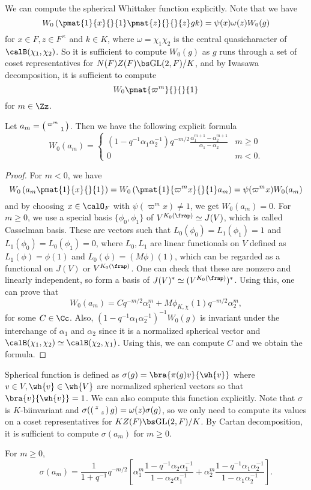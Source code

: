 We can compute the spherical Whittaker function explicitly. 
Note that we have
$$
W_{0}\left( \pmat{1}{x}{}{1} \pmat{z}{}{}{z} gk\right) = \psi(x)\omega(z)W_{0}(g)
$$
for $x\in F, z\in F^{\times}$ and $k\in K$, where $\omega = \chi_1 \chi_2$ is the central quasicharacter of $\calB(\chi_1, \chi_2)$. 
So it is sufficient to compute $W_{0}(g)$ as $g$ runs through a set of coset representatives for $N(F)Z(F)\bs \GL(2, F)/ K$, and by Iwasawa decomposition, it is sufficient to compute 
$$
W_{0}\pmat{\varpi^m}{}{}{1}
$$
for $m\in \Zz$. 
\begin{theorem}
\label{explicitsph}
Let $a_{m} = \left(\begin{smallmatrix} \varpi^m &  \\  & 1 \end{smallmatrix}\right)$. Then we have the following explicit formula
$$
W_{0}(a_m) = \begin{cases} (1-q^{-1}\alpha_1 \alpha_2^{-1}) q^{-m/2} \frac{\alpha_{1}^{m+1} -\alpha_{2}^{m+1}}{\alpha_{1} - \alpha_{2}} & m \geq 0 \\ 0 & m < 0. \end{cases}
$$
\end{theorem}
\begin{proof}
For $m<0$, we have
$$
W_{0}\left( a_m \pmat{1}{x}{}{1} \right) = W_{0}\left( \pmat{1}{\varpi^{m}x}{}{1}a_m \right) = \psi(\varpi^{m}x)W_{0}(a_{m})
$$
and by choosing $x\in \calO_F$ with $\psi(\varpi^{m}x)\neq 1$, we get $W_{0}(a_{m}) = 0$. 
For $m\geq 0$, we use a special basis $\{\phi_0, \phi_1\}$ of $V^{K_{0}(\frap)} \simeq J(V)$, which is called Casselman basis. These are vectors such that $L_{0}(\phi_{0}) = L_{1}(\phi_{1}) = 1$ and $L_{1}(\phi_{0}) = L_{0}(\phi_{1}) = 0$, where $L_{0}, L_{1}$ are linear functionals on $V$ defined as $L_{1}(\phi) = \phi(1)$ and $L_{0}(\phi) = (M\phi)(1)$, which can be regarded as a functional on $J(V)$ or $V^{K_{0}(\frap)}$. One can check that these are nonzero and linearly independent, so form a basis of $J(V)^{*} \simeq (V^{K_{0}(\frap)})^{*}$. 
Using this, one can prove that
$$
W_{0}(a_{m}) = C q^{-m/2}\alpha_{1}^{m} + M\phi_{K, \chi}(1)  q^{-m/2}\alpha_2^m,
$$
for some $C\in \Cc$. Also, $(1-q^{-1}\alpha_{1}\alpha_{2}^{-1})^{-1}W_{0}(g)$ is invariant under the interchange of $\alpha_1$ and $\alpha_2$ since it is a normalized spherical vector and $\calB(\chi_1, \chi_2)\simeq \calB(\chi_2, \chi_1)$. 
Using this, we can compute $C$ and we obtain the formula. 
\end{proof}
Spherical function is defined as $\sigma(g) = \bra{\pi(g)v}{\wh{v}}$ where $v\in V, \wh{v}\in \wh{V}$ are normalized spherical vectors so that $\bra{v}{\wh{v}} = 1$. 
We can also compute this function explicitly. 
Note that $\sigma$ is $K$-biinvariant and $\sigma(\left(\begin{smallmatrix} z &  \\  & z \end{smallmatrix}\right)g) = \omega(z)\sigma(g)$, so we only need to compute its values on a coset representatives for $KZ(F) \bs \GL(2, F) / K$. 
By Cartan decomposition, it is sufficient to compute $\sigma(a_{m})$ for $m\geq 0$. 
\begin{theorem} For $m\geq 0$, 
$$
\sigma(a_m) = \frac{1}{1+q^{-1}} q^{-m/2} \left[ \alpha_1^m \frac{1 - q^{-1}\alpha_{2}\alpha_{1}^{-1}}{1-\alpha_{2}\alpha_{1}^{-1}} + \alpha_{2}^{m} \frac{1-q^{-1}\alpha_{1}\alpha_{2}^{-1}}{1-\alpha_{1}\alpha_{2}^{-1}}\right].
$$
\end{theorem}

